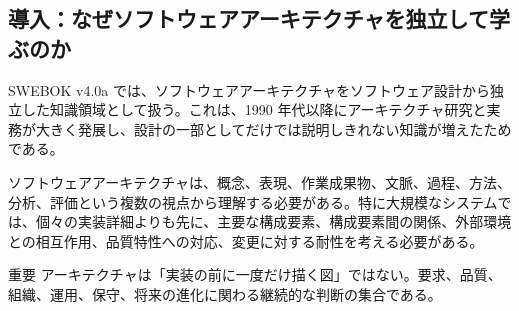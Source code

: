 \subsection*{導入：なぜソフトウェアアーキテクチャを独立して学ぶのか}
SWEBOK v4.0a では、ソフトウェアアーキテクチャをソフトウェア設計から独立した知識領域として扱う。これは、1990 年代以降にアーキテクチャ研究と実務が大きく発展し、設計の一部としてだけでは説明しきれない知識が増えたためである。

ソフトウェアアーキテクチャは、概念、表現、作業成果物、文脈、過程、方法、分析、評価という複数の視点から理解する必要がある。特に大規模なシステムでは、個々の実装詳細よりも先に、主要な構成要素、構成要素間の関係、外部環境との相互作用、品質特性への対応、変更に対する耐性を考える必要がある。

\begin{statementbox}{重要}
アーキテクチャは「実装の前に一度だけ描く図」ではない。要求、品質、組織、運用、保守、将来の進化に関わる継続的な判断の集合である。
\end{statementbox}
